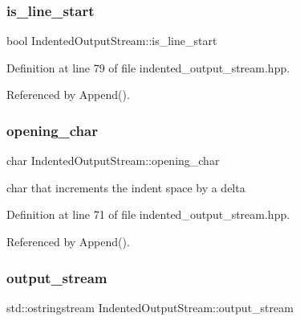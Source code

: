 \subsubsection{\texorpdfstring{is\+\_\+line\+\_\+start}{is\_line\_start}}
{\footnotesize\ttfamily bool Indented\+Output\+Stream\+::is\+\_\+line\+\_\+start\hspace{0.3cm}{\ttfamily [private]}}



Definition at line 79 of file indented\+\_\+output\+\_\+stream.\+hpp.



Referenced by Append().

\mbox{\label{classIndentedOutputStream_a7c0fd93cd1bf90d28b3791b61d6afdbd}} 
\subsubsection{\texorpdfstring{opening\+\_\+char}{opening\_char}}
{\footnotesize\ttfamily char Indented\+Output\+Stream\+::opening\+\_\+char\hspace{0.3cm}{\ttfamily [private]}}



char that increments the indent space by a delta 



Definition at line 71 of file indented\+\_\+output\+\_\+stream.\+hpp.



Referenced by Append().

\mbox{\label{classIndentedOutputStream_a0d1bb62525852927c422a0734686902a}} 
\subsubsection{\texorpdfstring{output\+\_\+stream}{output\_stream}}
{\footnotesize\ttfamily std\+::ostringstream Indented\+Output\+Stream\+::output\+\_\+stream\hspace{0.3cm}{\ttfamily [private]}}



